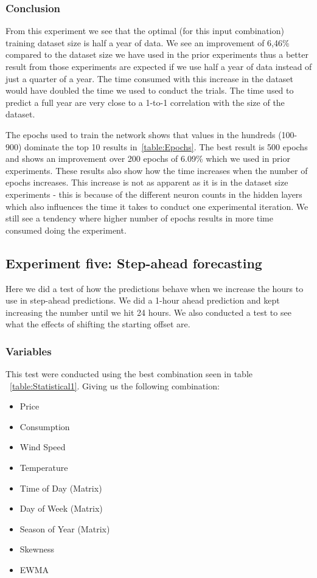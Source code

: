 \subsubsection{Conclusion}
From this experiment we see that the optimal (for this input combination) training dataset size is half a year of data. We see an improvement of 6,46\% compared to the dataset size we have used in the prior experiments thus a better result from those experiments are expected if we use half a year of data instead of just a quarter of a year. The time consumed with this increase in the dataset would have doubled the time we used to conduct the trials. The time used to predict a full year are very close to a 1-to-1 correlation with the size of the dataset.

The epochs used to train the network shows that values in the hundreds (100-900) dominate the top 10 results in~\ref{table:Epochs}. The best result is 500 epochs and shows an improvement over 200 epochs of 6.09\% which we used in prior experiments. These results also show how the time increases when the number of epochs increases. This increase is not as apparent as it is in the dataset size experiments - this is because of the different neuron counts in the hidden layers which also influences the time it takes to conduct one experimental iteration. We still see a tendency where higher number of epochs results in more time consumed doing the experiment.

\newpage
\subsection{Experiment five: Step-ahead forecasting}
\label{sec:priceExperimentFive}
Here we did a test of how the predictions behave when we increase the hours to use in step-ahead predictions. We did a 1-hour ahead prediction and kept increasing the number until we hit 24 hours. We also conducted a test to see what the effects of shifting the starting offset are.

\subsubsection{Variables}
This test were conducted using the best combination seen in table ~\ref{table:Statistical1}. Giving us the following combination:
\begin{itemize}
	\item Price
	\item Consumption
	\item Wind Speed
	\item Temperature
	\item Time of Day (Matrix)
	\item Day of Week (Matrix)
	\item Season of Year (Matrix)
	\item Skewness
	\item EWMA
\end{itemize}

